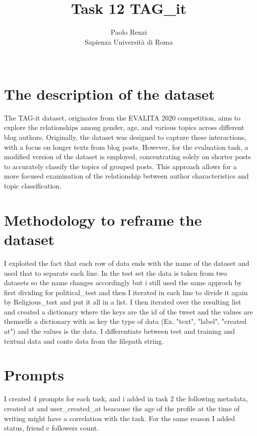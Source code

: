 \documentclass[11pt]{article}
\title{Task 12 TAG\_it}
\author{Paolo Renzi \\
  Sapienza Università di Roma\\\
  }
\begin{document}
\maketitle

\section{The description of the dataset}

The TAG-it dataset, originates from the EVALITA 2020 competition, aims to explore the relationships among gender, 
age, and various topics across different blog authors. Originally, the dataset was designed to capture these interactions, 
with a focus on longer texts from blog posts. However, for the evaluation task, a modified version of the dataset 
is employed, concentrating solely on shorter posts to accurately classify the topics of grouped posts. 
This approach allows for a more focused examination of the relationship between author characteristics and topic 
classification.

\section{Methodology to reframe the dataset}

I exploited the fact that each row of data ends with the name of the dataset and used that to separate each line. 
In the test set the data is taken from two datasets so the name changes accordingly but i still used the same approch 
by first dividing for political\_test and then I iterated in each line to divide it again by Religious\_test and put it all 
in a list. I then iterated over the resulting list and created a dictionary where the keys are the id of the tweet and 
the values are themselfs a dictionary with as key the type of data (Ex. "text", "label", "created at") and the values is 
the data. I differentiate between test and training and textual data and conte data from the filepath string.

\section{Prompts}

I created 4 prompts for each task, and i added in task 2 the following metadata, created at and user\_created\_at beacause the 
age of the profile at the time of writing might have a correlation with the task. For the same reason I added status, friend
e followers count.
\end{document}
